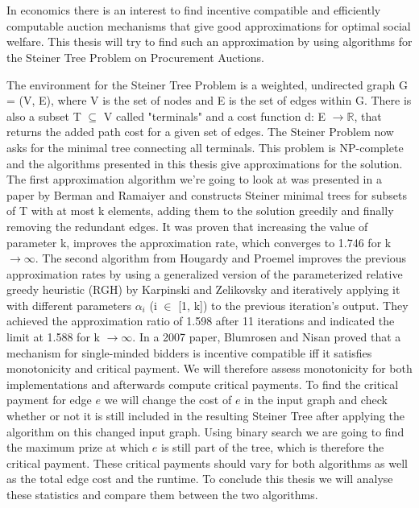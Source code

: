 \chapter{\abstractname}


In economics there is an interest to find incentive compatible and efficiently computable auction mechanisms that give good approximations for optimal social welfare. This thesis will try to find such an approximation by using algorithms for the Steiner Tree Problem on Procurement Auctions.%

The environment for the Steiner Tree Problem is a weighted, undirected graph G = (V, E), where V is the set of nodes and E is the set of edges within G. There is also a subset T $\subseteq$ V called "terminals" and a cost function d: E $\to \mathbb{R}$, that returns the added path cost for a given set of edges. The Steiner Problem now asks for the minimal tree connecting all terminals. This problem is NP-complete and the algorithms presented in this thesis give approximations for the solution. The first approximation algorithm we're going to look at was presented in a paper by Berman and Ramaiyer \cite{BeRa94} and constructs Steiner minimal trees for subsets of T with at most k elements,  adding them to the solution greedily and finally removing the redundant edges. It was proven that increasing the value of  parameter k, improves the approximation rate, which converges to 1.746 for k $\to \infty$. The second algorithm from Hougardy and Proemel \cite{HoPr99} improves the previous approximation rates by using a generalized version of the parameterized relative greedy heuristic (RGH) by Karpinski and Zelikovsky \cite{KaZe97} and iteratively applying it with different parameters $\alpha_i$ (i $\in$ [1, k]) to the previous iteration's output. They achieved the approximation ratio of 1.598 after 11 iterations and indicated the limit at 1.588 for k $\to \infty$. 
In a 2007 paper, Blumrosen and Nisan \cite{BlNi07} proved that a mechanism for single-minded bidders is incentive compatible iff it satisfies monotonicity and critical payment. We will therefore assess monotonicity for both implementations and afterwards compute critical payments. To find the critical payment for edge $e$ we will change the cost of $e$ in the input graph and check whether or not it is still included in the resulting Steiner Tree after applying the algorithm on this changed input graph. Using binary search we are going to find the maximum prize at which $e$ is still part of the tree, which is therefore the critical payment. These critical payments should vary for both algorithms as well as the total edge cost and the runtime. To conclude this thesis we will analyse these statistics and compare them between the two algorithms.

